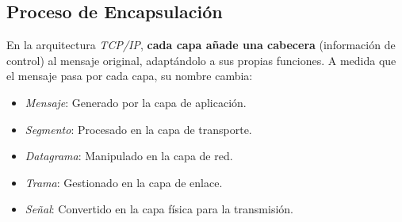 \documentclass{article}
\begin{document}
\subsection{Proceso de Encapsulación}
En la arquitectura \textit{TCP/IP}, \textbf{cada capa añade una cabecera} (información de control) al mensaje original, adaptándolo a sus propias funciones. A medida que el mensaje pasa por cada capa, su nombre cambia:
\begin{itemize}
    \item \textit{Mensaje}: Generado por la capa de aplicación.
    \item \textit{Segmento}: Procesado en la capa de transporte.
    \item \textit{Datagrama}: Manipulado en la capa de red.
    \item \textit{Trama}: Gestionado en la capa de enlace.
    \item \textit{Señal}: Convertido en la capa física para la transmisión.
\end{itemize}

\end{document}
